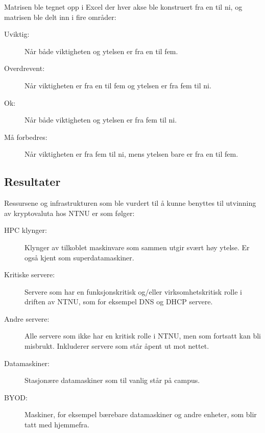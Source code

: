 Matrisen ble tegnet opp i Excel der hver akse ble konstruert fra en til ni, og matrisen ble delt inn i fire områder:
\begin{description}
    \item[Uviktig:] Når både viktigheten og ytelsen er fra en til fem.
    \item[Overdrevent:] Når viktigheten er fra en til fem og ytelsen er fra fem til ni.
    \item[Ok:] Når både viktigheten og ytelsen er fra fem til ni.
    \item[Må forbedres:] Når viktigheten er fra fem til ni, mens ytelsen bare er fra en til fem.
\end{description}

\subsection{Resultater}
Ressursene og infrastrukturen som ble vurdert til å kunne benyttes til utvinning av kryptovaluta hos NTNU er som følger:
\begin{description}
    \item[HPC klynger:] Klynger av tilkoblet maskinvare som sammen utgir svært høy ytelse. Er også kjent som superdatamaskiner.
    \item[Kritiske servere:] Servere som har en funksjonskritisk og/eller virksomhetskritisk rolle i driften av NTNU, som for eksempel DNS og DHCP servere. 
    \item[Andre servere:] Alle servere som ikke har en kritisk rolle i NTNU, men som fortsatt kan bli misbrukt. Inkluderer servere som står åpent ut mot nettet.
    \item[Datamaskiner:] Stasjonære datamaskiner som til vanlig står på campus.
    \item[BYOD:] Maskiner, for eksempel bærebare datamaskiner og andre enheter, som blir tatt med hjemmefra.
\end{description}

